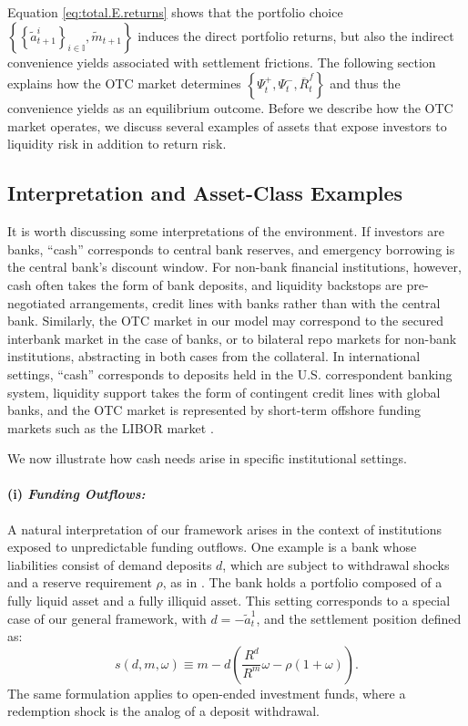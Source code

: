 \documentclass[12pt,american,english,notitlepage]{article}
\begin{document}
Equation \eqref{eq:total.E.returns} shows that the portfolio choice
$\left\{ \left\{ \tilde{a}_{t+1}^{i}\right\} _{i\in\mathbb{I}},\tilde{m}_{t+1}\right\} $
induces the direct portfolio returns, but also the indirect convenience
yields associated with settlement frictions. The following section
explains how the OTC market determines $\left\{ \Psi_{t}^{+},\Psi_{t}^{-},\overline{R}_{t}^{f}\right\} $
and thus the convenience yields as an equilibrium outcome. Before we describe how the OTC market operates, we discuss several examples of assets that expose investors to liquidity risk in addition to return
risk.

\subsection{Interpretation and Asset-Class Examples}

It is worth discussing some interpretations of the environment. If investors are banks, ``cash'' corresponds to central bank reserves, and emergency borrowing is the central bank's discount window. For non-bank financial institutions, however, cash often takes the form of bank deposits, and liquidity backstops are pre-negotiated arrangements, credit lines with banks rather than with the central bank. Similarly, the OTC market in our model may correspond to the secured interbank market in the case of banks, or to bilateral repo markets for non-bank institutions, abstracting in both cases from the collateral. In international settings, ``cash'' corresponds to deposits held in the U.S. correspondent banking system, liquidity support takes the form of contingent credit lines with global banks, and the OTC market is represented by short-term offshore funding markets such as the LIBOR market \citep[see][]{Bianchi2020}. 

We now illustrate how cash needs arise in specific institutional settings.

\paragraph*{(i) \textit{Funding Outflows:}} 

A natural interpretation of our framework arises in the context of institutions exposed to unpredictable funding outflows. One example is a bank whose liabilities consist of demand deposits $d$, which are subject to withdrawal shocks and a reserve requirement $\rho$, as in \citet{BB17}. The bank holds a portfolio composed of a fully liquid asset and a fully illiquid asset. This setting corresponds to a special case of our general framework, with $d = -\tilde{a}_{t}^{1}$, and the settlement position defined as:
\[
s(d, m, \omega) \equiv m - d\left(\frac{R^{d}}{R^{m}}\omega - \rho(1+\omega)\right).
\]
The same formulation applies to open-ended investment funds, where a redemption shock is the analog of a deposit withdrawal.
\end{document}
